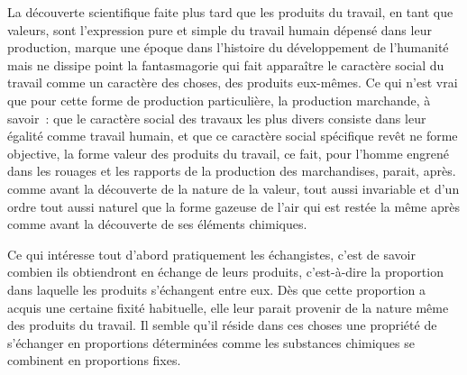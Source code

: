 \documentclass[french,twoside]{book} %
\begin{document}
La découverte scientifique faite plus tard que les produits du travail, en tant que valeurs, sont l’expression pure et simple du travail humain dépensé dans leur production, marque une époque dans l’histoire du développement de l’humanité mais ne dissipe point la fantasmagorie qui fait apparaître le caractère social du travail comme un caractère des choses, des produits eux-mêmes. Ce qui n’est vrai que pour cette forme de production particulière, la production marchande, à savoir : que le caractère social des travaux les plus divers consiste dans leur égalité comme travail humain, et que ce caractère social spécifique revêt ne forme objective, la forme valeur des produits du travail, ce fait, pour l’homme engrené dans les rouages et les rapports de la production des marchandises, parait, après. comme avant la découverte de la nature de la valeur, tout aussi invariable et d’un ordre tout aussi naturel que la forme gazeuse de l’air qui est restée la même après comme avant la découverte de ses éléments chimiques.\par
Ce qui intéresse tout d’abord pratiquement les échangistes, c’est de savoir combien ils obtiendront en échange de leurs produits, c’est-à-dire la proportion dans laquelle les produits s’échangent entre eux. Dès que cette proportion a acquis une certaine fixité habituelle, elle leur parait provenir de la nature même des produits du travail. Il semble qu’il réside dans ces choses une propriété de s’échanger en proportions déterminées comme les substances chimiques se combinent en proportions fixes.\par
\end{document}
